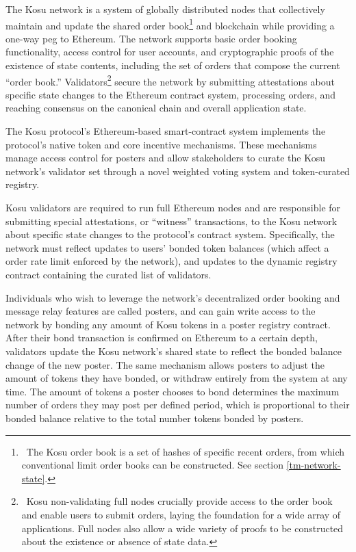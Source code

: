\documentclass[10pt]{article}
\begin{document}
The Kosu network is a system of globally distributed nodes that collectively maintain and update the shared order book\footnote{\ The Kosu order book is a set of hashes of specific recent orders, from which conventional limit order books can be constructed. See section \ref{tm-network-state}.} and blockchain while providing a one-way peg to Ethereum. The network supports basic order booking functionality, access control for user accounts, and cryptographic proofs of the existence of state contents, including the set of orders that compose the current ``order book.'' Validators\footnote{\ Kosu non-validating full nodes crucially provide access to the order book and enable users to submit orders, laying the foundation for a wide array of applications. Full nodes also allow a wide variety of proofs to be constructed about the existence or absence of state data.} secure the network by submitting attestations about specific state changes to the Ethereum contract system, processing orders, and reaching consensus on the canonical chain and overall application state. 
\medskip

The Kosu protocol’s Ethereum-based smart-contract system implements the protocol’s native token and core incentive mechanisms. These mechanisms manage access control for posters and allow stakeholders to curate the Kosu network’s validator set through a novel weighted voting system and token-curated registry.
\medskip

Kosu validators are required to run full Ethereum nodes and are responsible for submitting special attestations, or ``witness'' transactions, to the Kosu network about specific state changes to the protocol’s contract system. Specifically, the network must reflect updates to users’ bonded token balances (which affect a order rate limit enforced by the network), and updates to the dynamic registry contract containing the curated list of validators.
\medskip

Individuals who wish to leverage the network’s decentralized order booking and message relay features are called posters, and can gain write access to the network by bonding any amount of Kosu tokens in a poster registry contract. After their bond transaction is confirmed on Ethereum to a certain depth, validators update the Kosu network's shared state to reflect the bonded balance change of the new poster. The same mechanism allows posters to adjust the amount of tokens they have bonded, or withdraw entirely from the system at any time. The amount of tokens a poster chooses to bond determines the maximum number of orders they may post per defined period, which is proportional to their bonded balance relative to the total number tokens bonded by posters.
\medskip
\end{document}
